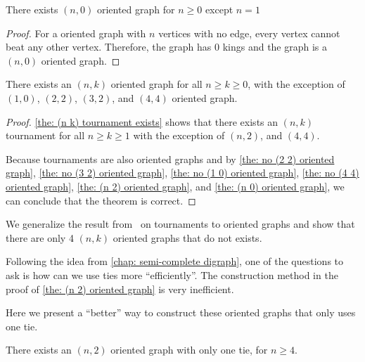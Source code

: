 \begin{lemma}\label{the: (n 0) oriented graph}
  There exists \((n, 0)\) oriented graph for \(n \geq 0\)
  except \(n = 1\)
\end{lemma}

\begin{proof}
  For a oriented graph with \(n\) vertices with no edge,
  every vertex cannot beat any other vertex.
  Therefore, the graph has 0 kings
  and the graph is a \((n, 0)\) oriented graph.
\end{proof}

\begin{theorem}\label{the: (n k) oriented graph}
  There exists an \((n, k)\) oriented graph for all \(n \geq k \geq 0\),
  with the exception of \((1, 0)\), \((2, 2)\), \((3, 2)\),
  and \((4, 4)\) oriented graph.
\end{theorem}

\begin{proof}
  \cref{the: (n k) tournament exists} shows that
  there exists an \((n, k)\) tournament for all \(n \geq k \geq 1\)
  with the exception of \((n, 2)\), and \((4, 4)\).

  Because tournaments are also oriented graphs and
  by \cref{the: no (2 2) oriented graph},
  \cref{the: no (3 2) oriented graph},
  \cref{the: no (1 0) oriented graph},
  \cref{the: no (4 4) oriented graph},
  \cref{the: (n 2) oriented graph},
  and \cref{the: (n 0) oriented graph},
  we can conclude that the theorem is correct.
\end{proof}

We generalize the result from~\cite{maurer_king_1980}
on tournaments to oriented graphs
and show that there are only 4
\((n, k)\) oriented graphs that do not exists.

Following the idea from \cref{chap: semi-complete digraph},
one of the questions to ask is how can we use
ties more ``efficiently''.
The construction method in the proof of
\cref{the: (n 2) oriented graph} is very inefficient.

Here we present a ``better'' way to construct
these oriented graphs that only uses one tie.

\begin{lemma}\label{the: (n 2) with one tie}
  There exists an \((n, 2)\) oriented graph
  with only one tie, for \(n \geq 4\).
\end{lemma}


